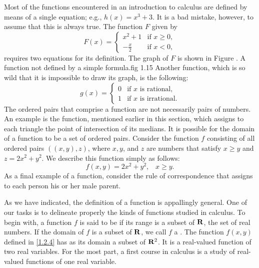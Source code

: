 Most of the functions encountered in an introduction to calculus
are defined by means of a single equation;
e.g., $h(x) = x^3 + 3$.
It is a bad mistake, however,
to assume that this is always true.
The function $F$ given by
\[
F(x) = \left \{ \begin{array}{ll}
        x^2 + 1           &\mbox{if $x \geq 0$},\\
        -\frac{x}{2}      &\mbox{if $x < 0$},
                   \end{array}
\right. 
\]
requires two equations for its definition.
The graph of $F$ is shown in Figure .
{A function not defined by a simple formula.}{fig 1.15}
Another function,
which is so wild that it is impossible to draw its graph,
is the following:
\[
g(x) = \left \{ \begin{array}{ll}
				0        & \mbox{if $x$ is rational,}\\
				1        & \mbox{if $x$ is irrational.}							\end{array}
\right.
\]
The ordered pairs that comprise a function
are not necessarily pairs of numbers.
An example is the function,
mentioned earlier in this section,
which assigns to each triangle
the point of intersection of its medians.
It is possible for the domain of a function to be
a set of ordered pairs.
Consider the function $f$ consisting of all ordered pairs $((x, y), z)$,
where $x, y$, and $z$ are numbers that satisfy
$x \geq y$ and $z = 2x^2 + y^2$.
We describe this function simply as follows:
\begin{equation}
f(x, y) = 2x^2 + y^2,          \;\;\;  x \geq y.  
\label{eq1.2.4}
\end{equation}
As a final example of a function,
consider the rule of correspondence that assigns to each person
his or her male parent.

As we have indicated,
the definition of a function is appallingly general.
One of our tasks is to delineate properly
the kinds of functions studied in calculus.
To begin with,
a function $f$ is said to be 
if its range is a subset of $\mathrm{\bf R}$, the set of real numbers.
If the domain of $f$ is a subset of $\mathrm{\bf R}$,
we call $f$ a .
The function $f(x, y)$ defined in \eqref{1.2.4}
has as its domain a subset of $\mathrm{\bf R}^2$.
It is a real-valued function of two real variables.
For the most part,
a first course in calculus is a study of
real-valued functions of one real variable.

